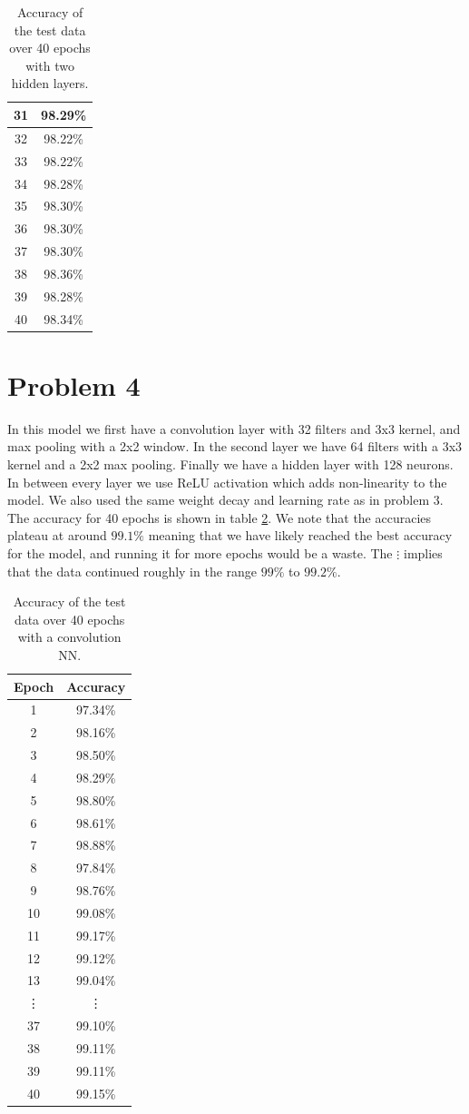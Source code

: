 \documentclass[a4paper]{article}
\begin{document}
\begin{table}[H]
\begin{tabular}{|c|c|}
		\hline 31 & 98.29\%\\
		\hline 32 & 98.22\%\\
		\hline 33 & 98.22\%\\
		\hline 34 & 98.28\%\\
		\hline 35 & 98.30\%\\
		\hline 36 & 98.30\%\\
		\hline 
		37 & 98.30\%\\
		\hline 
		38 & 98.36\%\\
		\hline 
		39 & 98.28\%\\
		\hline 
		40 & 98.34\%\\
		\hline
	\end{tabular}
	\caption{Accuracy of the test data over 40 epochs with two hidden layers. }
	\label{tab2}
\end{table}
\section*{Problem 4}
In this model we first have a convolution layer with 32 filters and 3x3 kernel, and max pooling with a 2x2 window.
In the second layer we have 64 filters with a 3x3 kernel and a 2x2 max pooling. Finally we have a hidden layer with 128 neurons. In between every layer we use ReLU activation which adds non-linearity to the model. We also used the same weight decay and learning rate as in problem 3. The accuracy for 40 epochs is shown in table \ref{tab3}. We note that the accuracies plateau at around $99.1\%$ meaning that we have likely reached the best accuracy for the model, and running it for more epochs would be a waste. The $\vdots$ implies that the data continued roughly in the range $99\%$ to $99.2\%$.
\begin{table}[H]
	\centering
	\begin{tabular}{|c|c|}
	\hline
	Epoch & Accuracy \\
	\hline1 & 97.34\% \\
	\hline2 & 98.16\% \\
	\hline3 & 98.50\% \\
	\hline4 & 98.29\% \\
	\hline5 & 98.80\% \\
	\hline6 & 98.61\% \\
	\hline7 & 98.88\% \\
	\hline8 & 97.84\% \\
	\hline9 & 98.76\% \\
	\hline10 & 99.08\%\\
	\hline11 & 99.17\%\\
	\hline12 & 99.12\%\\
	\hline13 & 99.04\%\\
	\hline\vdots & \vdots\\
	\hline37 & 99.10\%\\
	\hline38 & 99.11\%\\
	\hline39 & 99.11\%\\
	\hline40 & 99.15\%\\
	\hline\end{tabular}
	\caption{Accuracy of the test data over 40 epochs with a convolution NN. }
	\label{tab3}
\end{table}
\end{document}
